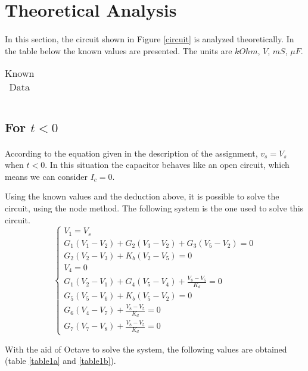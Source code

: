 \section{Theoretical Analysis}
\label{sec:analysis}
\paragraph{}
\par In this section, the circuit shown in Figure \ref{circuit} is analyzed
theoretically. In the table below the known values are presented. The units are $kOhm$, $V$, $mS$, $\mu F$.
\begin{table}[H]
    \centering
    \begin{tabular}{|c|c|}
    \hline
        
    \end{tabular}
    \caption{Known Data}
    \label{data}
\end{table}
\subsection{For $t<0$}
\paragraph{}
\par According to the equation given in the description of the assignment, $v_s=V_s$ when $t<0$. In this situation the capacitor behaves like an open circuit, which means we can consider $I_c = 0$.
\par Using the known values and the deduction above, it is possible to solve the circuit, using the node method.
The following system is the one used to solve this circuit.
$$
\begin{cases} 
	V_1 = V_s \\ 
	G_1 (V_1-V_2) + G_2 (V_3-V_2) + G_3 (V_5-V_2) = 0 \\
	G_2 (V_2-V_3) + K_b (V_2-V_5) = 0 \\
	V_4 = 0 \\
	G_1 (V_2-V_1) + G_4 (V_5-V_4) + \frac{V_8-V_5}{K_d} = 0 \\ 
	G_5 (V_5-V_6) + K_b (V_5-V_2) = 0 \\
	G_6 (V_4-V_7) + \frac{V_8-V_5}{K_d} = 0 \\ 
	G_7 (V_7-V_8) + \frac{V_8-V_5}{K_d} = 0 
\label{system1}
\end{cases}
$$

With the aid of Octave to solve the system, the following values are obtained (table \ref{table1a} and \ref{table1b}).

